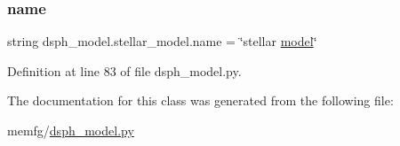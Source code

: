 \subsubsection{\texorpdfstring{name}{name}}
{\footnotesize\ttfamily string dsph\+\_\+model.\+stellar\+\_\+model.\+name = \char`\"{}stellar \hyperlink{classdsph__model_1_1model}{model}\char`\"{}\hspace{0.3cm}{\ttfamily [static]}}



Definition at line 83 of file dsph\+\_\+model.\+py.



The documentation for this class was generated from the following file\+:\begin{DoxyCompactItemize}
\item 
memfg/\hyperlink{dsph__model_8py}{dsph\+\_\+model.\+py}\end{DoxyCompactItemize}
